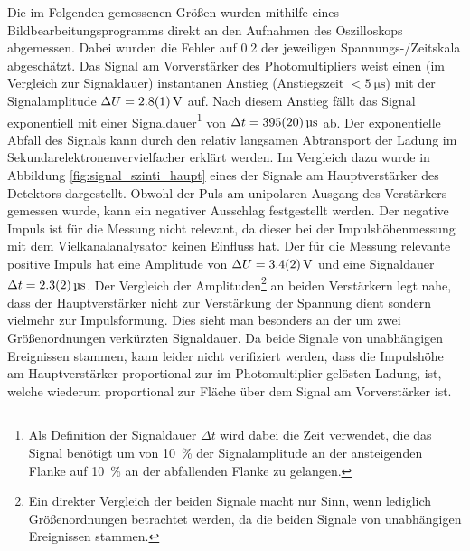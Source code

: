 \documentclass[11pt, a4paper]{article}
\numberwithin{equation}{section}
\begin{document}
Die im Folgenden gemessenen Größen wurden mithilfe eines Bildbearbeitungsprogramms direkt an den Aufnahmen des Oszilloskops abgemessen.
Dabei wurden die Fehler auf \SI{0.2}{\division} der jeweiligen Spannungs-/Zeitskala abgeschätzt.
Das Signal am Vorverstärker des Photomultipliers weist einen (im Vergleich zur Signaldauer) instantanen Anstieg (Anstiegszeit $< \SI{5}{\micro\second}$) mit der Signalamplitude $\Delta U = \SI{2.8 +- 0.1}{\volt}$ auf.
Nach diesem Anstieg fällt das Signal exponentiell mit einer Signaldauer\footnote{Als Definition der Signaldauer $\Delta t$ wird dabei die Zeit verwendet, die das Signal benötigt um von \SI{10}{\percent} der Signalamplitude an der ansteigenden Flanke auf \SI{10}{\percent} an der abfallenden Flanke zu gelangen.} von $\Delta t = \SI{395 +- 20}{\micro\second}$ ab.
Der exponentielle Abfall des Signals kann durch den relativ langsamen Abtransport der Ladung im Sekundarelektronenvervielfacher erklärt werden.
Im Vergleich dazu wurde in Abbildung \ref{fig:signal_szinti_haupt} eines der Signale am Hauptverstärker des Detektors dargestellt.
Obwohl der Puls am unipolaren Ausgang des Verstärkers gemessen wurde, kann ein negativer Ausschlag festgestellt werden.
Der negative Impuls ist für die Messung nicht relevant, da dieser bei der Impulshöhenmessung mit dem Vielkanalanalysator keinen Einfluss hat.
Der für die Messung relevante positive Impuls hat eine Amplitude von $\Delta U = \SI{3.4 +- 0.2}{\volt}$ und eine Signaldauer $\Delta t = \SI{2.3 +- 0.2}{\micro\second}$.
Der Vergleich der Amplituden\footnote{Ein direkter Vergleich der beiden Signale macht nur Sinn, wenn lediglich Größenordnungen betrachtet werden, da die beiden Signale von unabhängigen Ereignissen stammen.} an beiden Verstärkern legt nahe, dass der Hauptverstärker nicht zur Verstärkung der Spannung dient sondern vielmehr zur Impulsformung.
Dies sieht man besonders an der um zwei Größenordnungen verkürzten Signaldauer.
Da beide Signale von unabhängigen Ereignissen stammen, kann leider nicht verifiziert werden, dass die Impulshöhe am Hauptverstärker proportional zur im Photomultiplier gelösten Ladung, ist, welche wiederum proportional zur Fläche über dem Signal am Vorverstärker ist.
\end{document}
